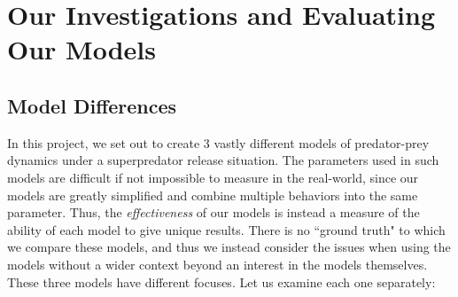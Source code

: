 \documentclass[journal]{IEEEtran}
\begin{document}

\newpage

\section{Our Investigations and Evaluating Our Models}
\subsection{Model Differences}


In this project, we set out to create 3 vastly different models of predator-prey dynamics under a superpredator release situation. The parameters used in such models are difficult if not impossible to measure in the real-world, since our models are greatly simplified and combine multiple behaviors into the same parameter. Thus, the \emph{effectiveness} of our models is instead a measure of the ability of each model to give unique results. There is no ``ground truth" to which we compare these models, and thus we instead consider the issues when using the models without a wider context beyond an interest in the models themselves. These three models have different focuses. Let us examine each one separately: \par
\end{document}
